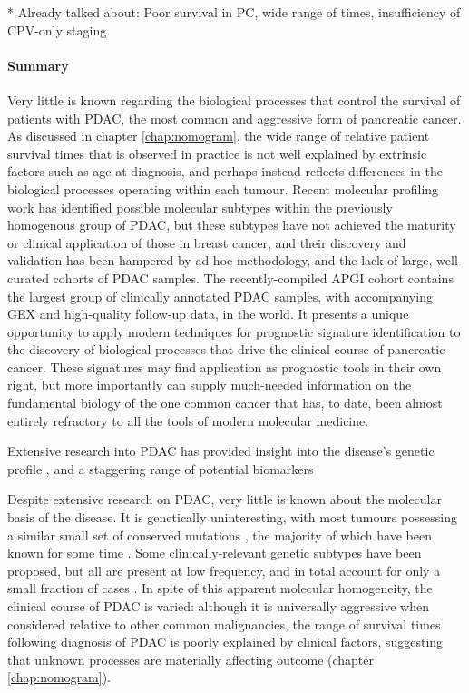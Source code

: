 \documentclass[dissertation.tex]{subfiles}
\begin{document}
* Already talked about: Poor survival in PC, wide range of times, insufficiency of CPV-only staging.

\paragraph{Summary}Very little is known regarding the biological processes that control the survival of patients with \gls{PDAC}, the most common and aggressive form of pancreatic cancer.  As discussed in chapter \ref{chap:nomogram}, the wide range of relative patient survival times that is observed in practice is not well explained by extrinsic factors such as age at diagnosis, and perhaps instead reflects differences in the biological processes operating within each tumour.  Recent molecular profiling work has identified possible molecular subtypes within the previously homogenous group of \gls{PDAC}, but these subtypes have not achieved the maturity or clinical application of those in breast cancer, and their discovery and validation has been hampered by ad-hoc methodology, and the lack of large, well-curated cohorts of \gls{PDAC} samples.  The recently-compiled \gls{APGI} cohort contains the largest group of clinically annotated \gls{PDAC} samples, with accompanying \gls{GEX} and high-quality follow-up data, in the world.  It presents a unique opportunity to apply modern techniques for prognostic signature identification to the discovery of biological processes that drive the clinical course of pancreatic cancer.  These signatures may find application as prognostic tools in their own right, but more importantly can supply much-needed information on the fundamental biology of the one common cancer that has, to date, been almost entirely refractory to all the tools of modern molecular medicine.

Extensive research into \gls{PDAC} has provided insight into the disease's genetic profile \cite{Biankin2012}, and a staggering range of potential biomarkers \cite{Harsha2009}

Despite extensive research on \gls{PDAC}, very little is known about the molecular basis of the disease.  It is genetically uninteresting, with most tumours possessing a similar small set of conserved mutations \cite{Biankin2012}, the majority of which have been known for some time \cite{Hilgers1999}.  Some clinically-relevant genetic subtypes have been proposed, but all are present at low frequency, and in total account for only a small fraction of cases \cite{Chang2014}.  In spite of this apparent molecular homogeneity, the clinical course of \gls{PDAC} is varied: although it is universally aggressive when considered relative to other common malignancies, the range of survival times following diagnosis of \gls{PDAC} is poorly explained by clinical factors, suggesting that unknown processes are materially affecting outcome (chapter \ref{chap:nomogram}).
\end{document}
